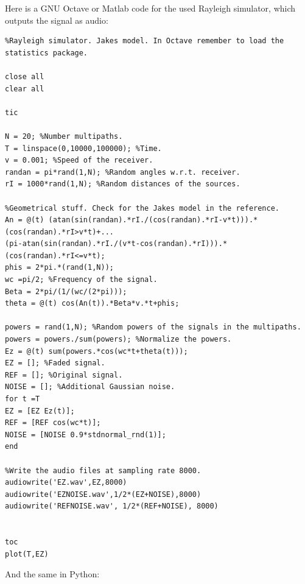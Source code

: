 \documentclass{article}
\begin{document}
Here is a GNU Octave or Matlab code for the used Rayleigh simulator, which outputs the signal as audio:
\begin{verbatim}
%Rayleigh simulator. Jakes model. In Octave remember to load the statistics package.

close all
clear all

tic

N = 20; %Number multipaths.
T = linspace(0,10000,100000); %Time.
v = 0.001; %Speed of the receiver.
randan = pi*rand(1,N); %Random angles w.r.t. receiver.
rI = 1000*rand(1,N); %Random distances of the sources.

%Geometrical stuff. Check for the Jakes model in the reference.
An = @(t) (atan(sin(randan).*rI./(cos(randan).*rI-v*t))).*(cos(randan).*rI>v*t)+...
(pi-atan(sin(randan).*rI./(v*t-cos(randan).*rI))).*(cos(randan).*rI<=v*t);
phis = 2*pi.*(rand(1,N));
wc =pi/2; %Frequency of the signal.
Beta = 2*pi/(1/(wc/(2*pi)));
theta = @(t) cos(An(t)).*Beta*v.*t+phis;

powers = rand(1,N); %Random powers of the signals in the multipaths.
powers = powers./sum(powers); %Normalize the powers.
Ez = @(t) sum(powers.*cos(wc*t+theta(t)));
EZ = []; %Faded signal.
REF = []; %Original signal.
NOISE = []; %Additional Gaussian noise.
for t =T
EZ = [EZ Ez(t)];
REF = [REF cos(wc*t)];
NOISE = [NOISE 0.9*stdnormal_rnd(1)];
end

%Write the audio files at sampling rate 8000.
audiowrite('EZ.wav',EZ,8000)
audiowrite('EZNOISE.wav',1/2*(EZ+NOISE),8000)
audiowrite('REFNOISE.wav', 1/2*(REF+NOISE), 8000)


toc
plot(T,EZ)
\end{verbatim}


And the same in Python:
\end{document}
